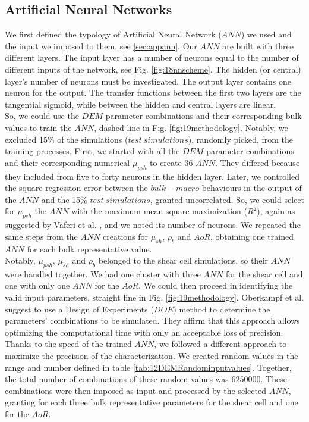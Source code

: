 \subsection{Artificial Neural Networks}
\label{subsec:ann}
We first defined the typology of Artificial Neural Network ($ANN$) we used and
the input we imposed to them, see \ref{sec:appann}.
Our $ANN$ are built with three different layers. 
The input layer has a number of neurons equal to the number of different inputs
of the network, see Fig. \ref{fig:18nnscheme}.
The hidden (or central) layer's number of neurons must be investigated. 
The output layer contains one neuron for the output.
The transfer functions between the first two layers are the tangential sigmoid, 
while between the hidden and central layers are linear.\\
So, we could use the $DEM$ parameter combinations and their corresponding bulk
values to train the $ANN$,
dashed line in Fig. \ref{fig:19methodology}.
Notably, we excluded 15\% of the simulations ($test ~ simulations$),
randomly picked, from the training processes.
First, we started with all the $DEM$ parameter combinations and their corresponding numerical $\mu_{psh}$ to create 36 $ANN$. 
They differed because they included from five to forty neurons in the hidden
layer.
Later, we controlled the square regression error between the $bulk-macro$ behaviours in the output of 
the $ANN$ and the 15\% $test ~ simulations$, granted uncorrelated. 
So, we could select for $\mu_{psh}$ the $ANN$ with the maximum 
mean square maximization ($R^2$), 
again as suggested by Vaferi et al. \cite{RefWorks:150}, and we noted its number
of neurons.
We repeated the same steps from the $ANN$ creations for $\mu_{sh}$, $\rho_b$ and $AoR$, 
obtaining one trained $ANN$ for each bulk representative value. \\
Notably, $\mu_{psh}$, $\mu_{sh}$ and $\rho_b$ belonged to the shear cell
simulations, so their $ANN$ were handled together. 
We had one cluster with three $ANN$ for the shear cell and one with only one $ANN$
for the $AoR$.
We could then proceed in identifying the valid input parameters, straight line
in Fig. \ref{fig:19methodology}.
Oberkampf et al. \cite{RefWorks:160} suggest to use a Design of Experiments
($DOE$) method to determine the parameters' combinations to be simulated.
They affirm that this approach allows optimizing the computational time with
only an acceptable loss of precision.
Thanks to the speed of the trained $ANN$, we followed a different approach to
maximize the precision of the characterization.
We created random values
in the range and number defined in table \ref{tab:12DEMRandominputvalues}.
Together, the total number of combinations of these random values was $6250000$.
These combinations were then imposed as input and processed by the selected
$ANN$, granting for each three bulk representative parameters for the shear cell and one for the $AoR$. 



